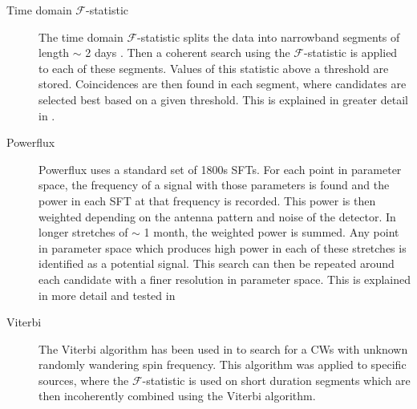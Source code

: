 \begin{description}
        \item[Time domain $\mathcal{F}$-statistic] The time domain
$\mathcal{F}$-statistic splits the data into narrowband segments of length
$\sim$ 2 days \citep{walsh2016ComparisonMethods}. Then a coherent search using
the $\mathcal{F}$-statistic is applied to each of these segments. Values of
this statistic above a threshold are stored. Coincidences are then found in
each segment, where candidates are selected best based on a given
threshold. This is explained in greater detail in
\citep{aasi2014ImplementationTextdollar,walsh2016ComparisonMethods}.
	
        \item[Powerflux] Powerflux uses a standard set of 1800s \glspl{SFT}.
For each point in parameter space, the frequency of a signal with those parameters is found and the power in each \gls{SFT} at that frequency is recorded. This power is then weighted depending on the antenna pattern and
noise of the detector. In longer stretches of $\sim$ 1 month, the weighted
power is summed. Any point in parameter space which produces high power in each
of these stretches is identified as a potential signal. This search can then be
repeated around each candidate with a finer resolution in parameter space. This
is explained in more detail and tested in
\citep{abadie2012AllskySearch,walsh2016ComparisonMethods,ligoscientificcollaborationandvirgocollaboration2016ComprehensiveAllsky}
	
        \item[Viterbi] The Viterbi algorithm \citep{viterbi1967ErrorBounds} has
been used in \citep{sun2018HiddenMarkov,
suvorova2017HiddenMarkov,abbott2017SearchGravitational,
abbott2018SearchGravitational, sun2018ApplicationHidden} to search for a
\glspl{CW} with unknown randomly wandering spin frequency. This
algorithm was applied to specific sources, where the $\mathcal{F}$-statistic is
used on short duration segments which are then incoherently combined using the
Viterbi algorithm.
	
\end{description}


